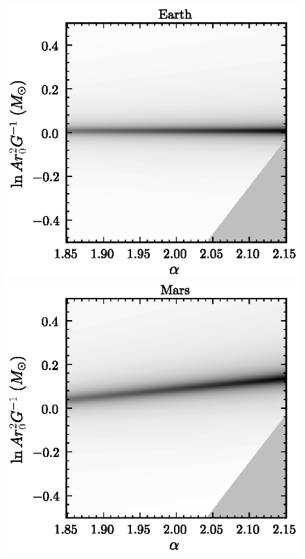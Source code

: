 \begin{figure}
\includegraphics[height=.2\textheight]{figs_solarsystem/jacobian_Earth.ps}
\includegraphics[height=.2\textheight]{figs_solarsystem/jacobian_Mars.ps}\\[5pt]

\end{figure}

